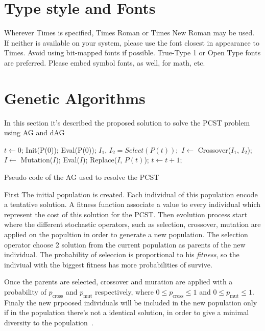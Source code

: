 \documentclass[10pt, conference, compsocconf]{IEEEtran}
\begin{document}
\section{Type style and Fonts}
Wherever Times is specified, Times Roman or Times New Roman may be used. If neither is available on your system, please use the font closest in appearance to Times. Avoid using bit-mapped fonts if possible. True-Type 1 or Open Type fonts are preferred. Please embed symbol fonts, as well, for math, etc.



\section{Genetic Algorithms}

In this section it's described the proposed solution to solve the PCST problem using AG and dAG 


\begin{algorithm}
  \begin{algorithmic}
\STATE
\STATE 
\STATE $t \gets 0$;
\STATE Init(P(0));
\STATE Eval(P(0));
\REPEAT 
\REPEAT
\STATE  $I_1$, $I_2 = Select(P(t));$
\STATE $I \gets $ Crossover($I_1$, $I_2$);
\ENDIF
{} 
\STATE $I \gets $ Mutation($I$);
\ENDIF
{}
\STATE Eval($I$);
\STATE Replace($I$, $P(t)$);
\ENDIF
{}
\STATE  $t \gets t + 1$;  
\STATE
\end{algorithmic}
\caption{Pseudo code of the AG used to resolve the PCST}
  \label{alg:pseudoAG}
\end{algorithm}


First The initial population is created. Each individual of this population encode a tentative solution. A fitness function associate a value to every individual which represent the cost of this solution for the PCST. Then evolution process start where the different stochastic operators, such as selection, crossover, mutation  are applied on the popultion in order to generate a new population. The selection operator choose 2 solution from the current population as parents of the new individual. The probability of seleccion is proportional to his {\em fitness}, so the indiviual with the biggest fitness has more probabilities of survive.

Once the parents are selected, crossover and muration are applied with a probability of $p_{\text{cross}}$ and $p_{\text{mut}}$ respectively, where $0 \leq p_{\text{cross}} \leq 1 $ and $0 \leq p_{\text{mut}} \leq 1$. Finaly the new prpoosed individuals will be included in the new population only if in the population there's not a identical solution, in order to give a minimal diversity to the population~\cite{raidl99}. \\
\end{document}
